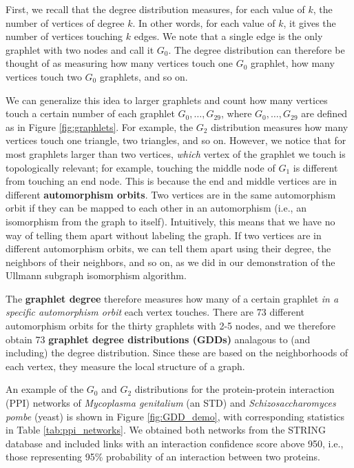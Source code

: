 \documentclass[12pt]{thesis}
\theoremstyle{plain}
\theoremstyle{definition}
\theoremstyle{remark}
\begin{document}
First, we recall that the degree distribution measures, for each value of $k$, the number of vertices of degree $k$. In other words, for each value of $k$, it gives the number of vertices touching $k$ edges. We note that a single edge is the only graphlet with two nodes and call it $G_0$. The degree distribution can therefore be thought of as measuring how many vertices touch one $G_0$ graphlet, how many vertices touch two $G_0$ graphlets, and so on.

We can generalize this idea to larger graphlets and count how many vertices touch a certain number of each graphlet $G_0, \dots, G_{29}$, where $G_0,\dots, G_{29}$ are defined as in Figure \ref{fig:graphlets}. For example, the $G_2$ distribution measures how many vertices touch one triangle, two triangles, and so on. However, we notice that for most graphlets larger than two vertices, \textit{which} vertex of the graphlet we touch is topologically relevant; for example, touching the middle node of $G_1$ is different from touching an end node. This is because the end and middle vertices are in different \textbf{automorphism orbits}. Two vertices are in the same automorphism orbit if they can be mapped to each other in an automorphism (i.e., an isomorphism from the graph to itself). Intuitively, this means that we have no way of telling them apart without labeling the graph. If two vertices are in different automorphism orbits, we can tell them apart using their degree, the neighbors of their neighbors, and so on, as we did in our demonstration of the Ullmann subgraph isomorphism algorithm.

The \textbf{graphlet degree} therefore measures how many of a certain graphlet \textit{in a specific automorphism orbit} each vertex touches. There are 73 different automorphism orbits for the thirty graphlets with 2-5 nodes, and we therefore obtain 73 \textbf{graphlet degree distributions (GDDs)} analagous to (and including) the degree distribution. Since these are based on the neighborhoods of each vertex, they measure the local structure of a graph. 

An example of the $G_0$ and $G_2$ distributions for the protein-protein interaction (PPI) networks of \textit{Mycoplasma genitalium} (an STD) and \textit{Schizosaccharomyces pombe} (yeast) is shown in Figure \ref{fig:GDD_demo}, with corresponding statistics in Table \ref{tab:ppi_networks}. We obtained both networks from the STRING database \cite{szklarczyk2014string} and included links with an interaction confidence score above 950, i.e., those representing 95\% probability of an interaction between two proteins. 
\end{document}
